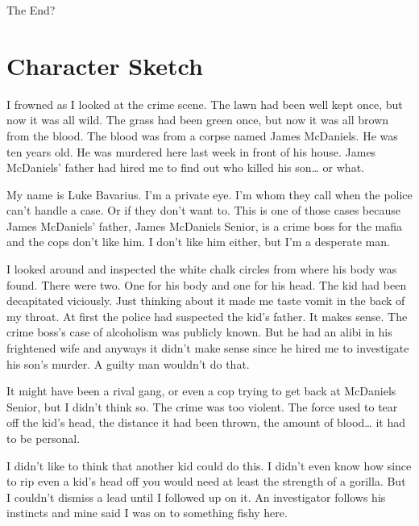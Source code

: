 The End?
 



\chapter{Character Sketch}



I frowned as I looked at the crime scene. The lawn had been well
kept once, but now it was all wild. The grass had been green once,
but now it was all brown from the blood. The blood was from a
corpse named James McDaniels. He was ten years old. He was murdered
here last week in front of his house. James McDaniels' father
had hired me to find out who killed his son{\ldots} or what.



My name is Luke Bavarius. I'm a private eye. I'm whom
they call when the police can't handle a case. Or if they
don't want to. This is one of those cases because James
McDaniels' father, James McDaniels Senior, is a crime boss
for the mafia and the cops don't like him. I don't like
him either, but I'm a desperate man.



I looked around and inspected the white chalk circles from where
his body was found. There were two. One for his body and one for
his head. The kid had been decapitated viciously. Just thinking
about it made me taste vomit in the back of my throat. At first the
police had suspected the kid's father. It makes sense. The
crime boss's case of alcoholism was publicly known. But he
had an alibi in his frightened wife and anyways it didn't
make sense since he hired me to investigate his son's murder.
A guilty man wouldn't do that.



It might have been a rival gang, or even a cop trying to get back
at McDaniels Senior, but I didn't think so. The crime was too
violent. The force used to tear off the kid's head, the
distance it had been thrown, the amount of blood{\ldots} it had to
be personal.



I didn't like to think that another kid could do this. I
didn't even know how since to rip even a kid's head off
you would need at least the strength of a gorilla. But I
couldn't dismiss a lead until I followed up on it. An
investigator follows his instincts and mine said I was on to
something fishy here.



